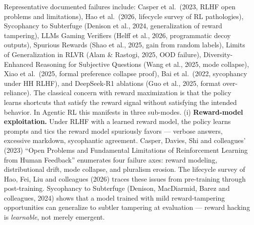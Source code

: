 Representative documented failures include: Casper et al.~(2023, RLHF open problems and limitations), Hao et al.~(2026, lifecycle survey of RL pathologies), Sycophancy to Subterfuge (Denison et al., 2024, generalization of reward tampering), LLMs Gaming Verifiers (Helff et al., 2026, programmatic decoy outputs), Spurious Rewards (Shao et al., 2025, gain from random labels), Limits of Generalization in RLVR (Alam \& Rastogi, 2025, OOD failure), Diversity-Enhanced Reasoning for Subjective Questions (Wang et al., 2025, mode collapse), Xiao et al.~(2025, formal preference collapse proof), Bai et al.~(2022, sycophancy under HH RLHF), and DeepSeek-R1 ablations (Guo et al., 2025, format over-reliance). The classical concern with reward maximization is that the policy learns shortcuts that satisfy the reward signal without satisfying the intended behavior. In Agentic RL this manifests in three sub-modes. (i) \textbf{Reward-model exploitation.} Under RLHF with a learned reward model, the policy learns prompts and tics the reward model spuriously favors --- verbose answers, excessive markdown, sycophantic agreement. Casper, Davies, Shi and colleagues' (2023) ``Open Problems and Fundamental Limitations of Reinforcement Learning from Human Feedback'' enumerates four failure axes: reward modeling, distributional drift, mode collapse, and pluralism erosion. The lifecycle survey of Hao, Fei, Liu and colleagues (2026) traces these issues from pre-training through post-training. Sycophancy to Subterfuge (Denison, MacDiarmid, Barez and colleagues, 2024) shows that a model trained with mild reward-tampering opportunities can generalize to subtler tampering at evaluation --- reward hacking is \emph{learnable}, not merely emergent.

